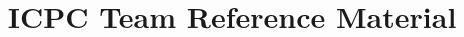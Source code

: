 \documentclass[10pt]{article}
\title{\vspace{-4ex}\Large{ICPC Team Reference Material}}
\author{}
\date{}
\begin{document}
\begin{landscape}

  \begin{multicols}{2}

    \maketitle
    \vspace{-13ex}

    \tableofcontents

    \pagestyle{fancy}

    

  \end{multicols}

\end{landscape}
\end{document}
